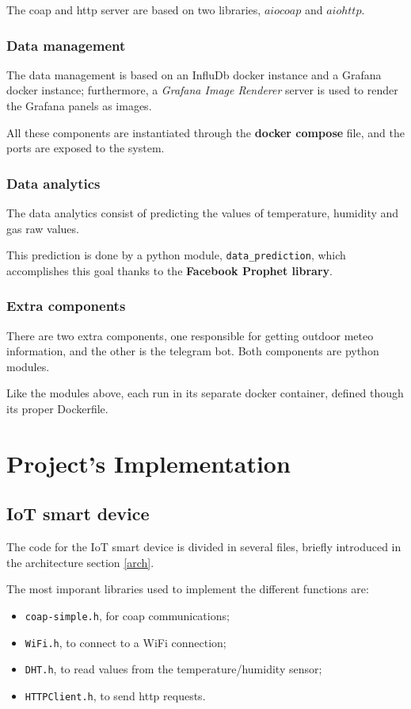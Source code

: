 \documentclass[]{article}
\begin{document}
The coap and http server are based on two libraries, $ aiocoap $  and $ aiohttp $.  

\subsubsection{Data management}
The data management is based on an InfluDb docker instance and a Grafana docker instance; furthermore, a \textit{Grafana Image Renderer} server is used to render the Grafana panels as images. 

All these components are instantiated through the \textbf{docker compose} file, and the ports are exposed to the system. 

\subsubsection{Data analytics}
The data analytics consist of predicting the values of temperature, humidity and gas raw values.

This prediction is done by a python module, \texttt{data\_prediction}, which accomplishes this goal thanks to the \textbf{Facebook Prophet library}. 

\subsubsection{Extra components}
There are two extra components, one responsible for getting outdoor meteo information, and the other is the telegram bot. Both components are python modules.

Like the modules above, each run in its separate docker container, defined though its proper Dockerfile. 

\section{Project's Implementation}
\subsection{IoT smart device}
The code for the IoT smart device is divided in several files, briefly introduced in the architecture section \ref{arch}.

The most imporant libraries used to implement the different functions are:
\begin{itemize}
	\item \texttt{coap-simple.h}, for coap communications;
	\item \texttt{WiFi.h}, to connect to a WiFi connection;
	\item \texttt{DHT.h}, to read values from the temperature/humidity sensor;
	\item \texttt{HTTPClient.h}, to send http requests.
\end{itemize}
\end{document}
